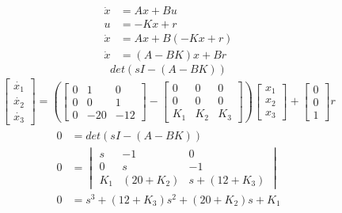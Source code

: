 \documentclass[../main.tex]{subfiles}
\begin{document}
            \begin{equation}
                \begin{split}
                    \dot{x} &= Ax + Bu \\[5pt]
                    u &= -Kx + r \\[5pt]
                    \dot{x} &= Ax + B( -Kx + r) \\[5pt]
                    \dot{x} &= (A - BK)x + Br
                \end{split}
            \end{equation}
            \begin{equation}
                det(sI - (A - BK))
            \end{equation}
            \begin{equation}
                \begin{split}
                    \begin{bmatrix} \dot{x_1} \\ \dot{x_2} \\ \dot{x_3} \end{bmatrix} = \left( \begin{bmatrix} 0 & 1 & 0 \\ 0 & 0 & 1 \\ 0 & -20 & -12 \end{bmatrix} - \begin{bmatrix} 0 & 0 & 0 \\ 0 & 0 & 0 \\ K_1 & K_2 & K_3 \end{bmatrix} \right) \begin{bmatrix} x_1 \\ x_2 \\ x_3 \end{bmatrix} + \begin{bmatrix} 0 \\ 0 \\ 1 \end{bmatrix} r
                \end{split}
            \end{equation}
            \begin{equation}
                \begin{split}
                    0 &= det(sI - ( A - BK )) \\[5pt] 
                    0 &= \begin{vmatrix} s & -1 & 0 \\ 0 & s & -1 \\ K_1 & (20 + K_2) & s + (12 + K_3) \end{vmatrix}\\[5pt]
                    0 &= s^3 + (12 + K_3)s^2 + (20 + K_2)s + K_1
                    \label{persamaan_karakteristik}
                \end{split}
            \end{equation}
\end{document}
